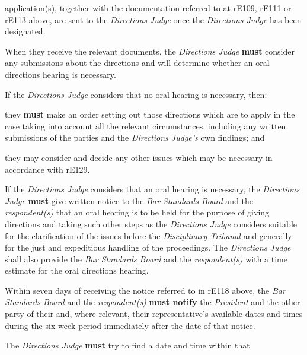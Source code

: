 application(s), together with the documentation referred to at rE109,
rE111 or rE113 above, are sent to the \emph{Directions Judge} once
the \emph{Directions Judge} has been designated.\\
\par
When they receive the relevant documents, the \emph{Directions
Judge}  \textcolor{myred}{\textbf{must}} consider any submissions about the directions and will
determine whether an oral directions hearing is necessary.\\
\par
If the \emph{Directions Judge} considers that no oral hearing is
necessary, then:\\\nl \item they  \textcolor{myred}{\textbf{must}} make an order setting out those directions which are to
apply in the case taking into account all the relevant circumstances,
including any written submissions of the parties and
the \emph{Directions Judge's} own findings; and\item they may consider and decide any other issues which may be necessary
in accordance with rE129.\ln
{}\par
If the \emph{Directions Judge} considers that an oral hearing is
necessary, the \emph{Directions Judge}  \textcolor{myred}{\textbf{must}} give written notice to
the \emph{Bar Standards Board} and the \emph{respondent(s) }that an oral
hearing is to be held for the purpose of giving directions and taking
such other steps as the \emph{Directions Judge }considers suitable for
the clarification of the issues before the \emph{Disciplinary
Tribunal} and generally for the just and expeditious handling of the
proceedings. The \emph{Directions Judge} shall also provide
the \emph{Bar Standards Board} and the \emph{respondent(s)} with a time
estimate for the oral directions hearing.\\
\par
Within seven days of receiving the notice referred to in rE118 above,
the \emph{Bar Standards Board} and the \emph{respondent(s)}  \textcolor{myred}{\textbf{must notify}} the \emph{President} and the other party of their and, where relevant,
their representative's available dates and times during the six week
period immediately after the date of that notice.\\
\par
The \emph{Directions Judge}  \textcolor{myred}{\textbf{must}} try to find a date and time within that
